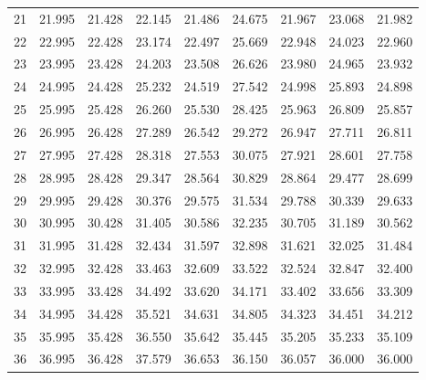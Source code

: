 \begin{tabular}{lcccccccc}
21	&	21.995	&	21.428	&	22.145	&	21.486	&	24.675	&	21.967	&	 23.068	&	21.982	\\
22	&	22.995	&	22.428	&	23.174	&	22.497	&	25.669	&	22.948	&	 24.023	&	22.960	\\
23	&	23.995	&	23.428	&	24.203	&	23.508	&	26.626	&	23.980	&	 24.965	&	23.932	\\
24	&	24.995	&	24.428	&	25.232	&	24.519	&	27.542	&	24.998	&	 25.893	&	24.898	\\
25	&	25.995	&	25.428	&	26.260	&	25.530	&	28.425	&	25.963	&	 26.809	&	25.857	\\
26	&	26.995	&	26.428	&	27.289	&	26.542	&	29.272	&	26.947	&	 27.711	&	26.811	\\
27	&	27.995	&	27.428	&	28.318	&	27.553	&	30.075	&	27.921	&	 28.601	&	27.758	\\
28	&	28.995	&	28.428	&	29.347	&	28.564	&	30.829	&	28.864	&	 29.477	&	28.699	\\
29	&	29.995	&	29.428	&	30.376	&	29.575	&	31.534	&	29.788	&	 30.339	&	29.633	\\
30	&	30.995	&	30.428	&	31.405	&	30.586	&	32.235	&	30.705	&	 31.189	&	30.562	\\
31	&	31.995	&	31.428	&	32.434	&	31.597	&	32.898	&	31.621	&	 32.025	&	31.484	\\
32	&	32.995	&	32.428	&	33.463	&	32.609	&	33.522	&	32.524	&	 32.847	&	32.400	\\
33	&	33.995	&	33.428	&	34.492	&	33.620	&	34.171	&	33.402	&	 33.656	&	33.309	\\
34	&	34.995	&	34.428	&	35.521	&	34.631	&	34.805	&	34.323	&	 34.451	&	34.212	\\
35	&	35.995	&	35.428	&	36.550	&	35.642	&	35.445	&	35.205	&	 35.233	&	35.109	\\
36	&	36.995	&	36.428	&	37.579	&	36.653	&	36.150	&	36.057	&	 36.000	&	36.000	\\
\hline
\end{tabular} 